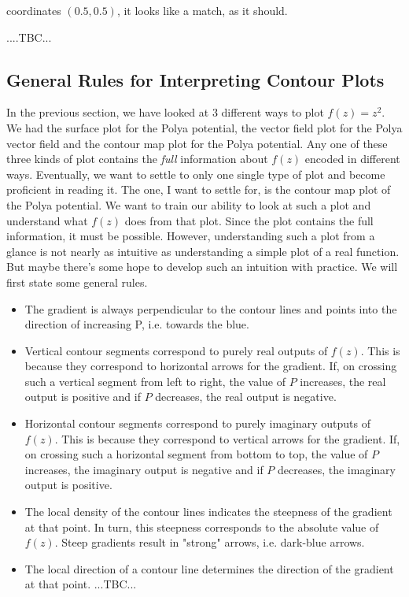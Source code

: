 \documentclass[12pt]{article}
\begin{document}
coordinates $(0.5,0.5)$, it looks like a match, as it should.

....TBC...

\subsection{General Rules for Interpreting Contour Plots}
In the previous section, we have looked at 3 different ways to plot $f(z) = z^2$. We had the surface plot for the Polya potential, the vector field plot for the Polya vector field and the contour map plot for the Polya potential. Any one of these three kinds of plot contains the \emph{full} information about $f(z)$ encoded in different ways. Eventually, we want to settle to only one single type of plot and become proficient in reading it. The one, I want to settle for, is the contour map plot of the Polya potential. We want to train our ability to look at such a plot and understand what $f(z)$ does from that plot. Since the plot contains the full information, it must be possible. However, understanding such a plot from a glance is not nearly as intuitive as understanding a simple plot of a real function. But maybe there's some hope to develop such an intuition with practice. We will first state some general rules.

\begin{itemize}
\item The gradient is always perpendicular to the contour lines and points into the direction of increasing P, i.e. towards the blue.
\item Vertical contour segments correspond to purely real outputs of $f(z)$. This is because they correspond to horizontal arrows for the gradient. If, on crossing such a vertical segment from left to right, the value of $P$ increases, the real output is positive and if $P$ decreases, the real output is negative.
\item Horizontal contour segments correspond to purely imaginary outputs of $f(z)$. This is because they correspond to vertical arrows for the gradient. If, on crossing such a horizontal segment from bottom to top, the value of $P$ increases, the imaginary output is negative and if $P$ decreases, the imaginary output is positive.
\item The local density of the contour lines indicates the steepness of the gradient at that point. In turn, this steepness corresponds to the absolute value of $f(z)$. Steep gradients result in "strong" arrows, i.e. dark-blue arrows.
\item The local direction of a contour line determines the direction of the gradient at that point. ...TBC...
\end{itemize}
\end{document}

